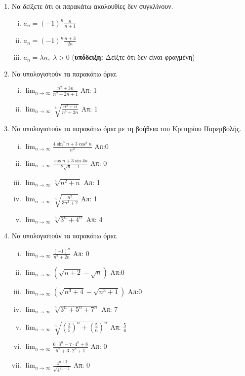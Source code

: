\begin{enumerate}
  \item Να δείξετε ότι οι παρακάτω ακολουθίες δεν συγκλίνουν.
    \begin{enumerate}[i)]
      \item $ a_{n} = (-1)^{n} \frac{n}{n+1}  $
      \item $ a_{n} = (-1)^{n} \frac{n+3}{2n}  $
      \item $  a_{n} = \lambda n, \; \lambda >0$ 
        \hfill (\textbf{υπόδειξη:} Δείξτε ότι δεν είναι φραγμένη)
    \end{enumerate}

  \item Να υπολογιστούν τα παρακάτω όρια.
    \begin{enumerate}[i)]
      \item $ \lim_{n \to \infty} \frac{n^{2}+3n}{n^{2}+2n+1} $ \hfill Απ: 1 
      \item $ \lim_{n \to \infty} \sqrt[3]{\frac{n^{3}+n}{n^{3}+2n}} $ 
        \hfill Απ: 1 
    \end{enumerate}

  \item Να υπολογιστούν τα παρακάτω όρια με τη βοήθεια του Κριτηρίου 
    Παρεμβολής.

    \begin{enumerate}[i)]
      \item $ \lim_{n \to \infty} \frac{4 \sin^{3}{n} + 3 \cos^{2}{n}}{n^{2}} $ 
        \hfill Απ:0
      \item $ \lim_{n \to \infty} \frac{\cos{n} + 3 \sin{4n}}{ 2
        \sqrt{n} -1} $ \hfill Απ: 0  
      \item $ \lim_{n \to \infty} \sqrt[n]{n^{2}+n} $ \hfill Απ: 1 
      \item $ \lim_{n \to \infty} \sqrt[n]{\frac{n^{2}}{3n^{2}+2}} $ \hfill Απ: 1 
      \item $ \lim_{n \to \infty} \sqrt[n]{3^{n}+4^{n}} $ \hfill Απ: 4 
    \end{enumerate}

\item Να υπολογιστούν τα παρακάτω όρια.

  \begin{enumerate}[i)]
    \item $ \lim_{n \to \infty} \frac{(-1)^{n}}{n^{2}+2n}  $ \hfill Απ: 0  
    \item $ \lim_{n \to \infty} (\sqrt{n+2} - \sqrt{n})  $ \hfill Απ:0
    \item $ \lim_{n \to \infty} (\sqrt{n^{3}+4} - \sqrt{n^{3}+1})  $ \hfill Απ:0
    \item $ \lim_{n \to \infty} \sqrt[n]{3^{n}+5^{n}+7^{n}}  $ \hfill Απ: 7 
    \item $ \lim_{n \to \infty} \sqrt[n]{\left(\frac{3}{5} \right)^{n} + 
      \left(\frac{5}{6} \right)^{n}} $ \hfill Απ: $ \frac{5}{6} $ 
    \item $ \lim_{n \to \infty} \frac{6\cdot 3^{n}-7 \cdot 4^{n}+8}
      {5^{n}+3\cdot 2^{n}+1} $ \hfill Απ: 0  
    \item $ \lim_{n \to \infty} \frac{4^{n+3}}{\sqrt{4^{4n-2}}} $ \hfill Απ: 0  
  \end{enumerate}
\end{enumerate}



